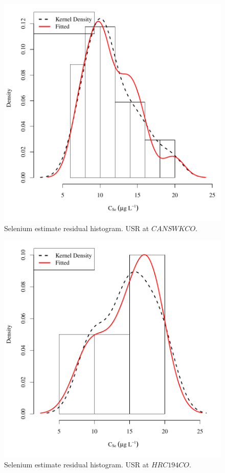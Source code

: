 \begin{figure}[htbp]
	\begin{center}
	\includegraphics[width=6in]{"Figures/Results_USR/Conc Model ResDist CAN"}
	\caption{Selenium estimate residual histogram.  USR at $CANSWKCO$.}
	\end{center}
\end{figure}
\newpage

\begin{figure}[htbp]
	\begin{center}
	\includegraphics[width=6in]{"Figures/Results_USR/Conc Model ResDist HRC"}
	\caption{Selenium estimate residual histogram.  USR at $HRC194CO$.}
	\end{center}
\end{figure}
\newpage

